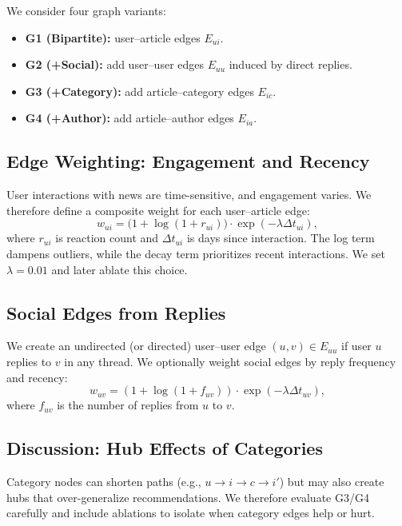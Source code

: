 \documentclass[11pt]{article}
\begin{document}
We consider four graph variants:
\begin{itemize}[leftmargin=*]
  \item \textbf{G1 (Bipartite):} user--article edges \(E_{ui}\).
  \item \textbf{G2 (+Social):} add user--user edges \(E_{uu}\) induced by direct replies.
  \item \textbf{G3 (+Category):} add article--category edges \(E_{ic}\).
  \item \textbf{G4 (+Author):} add article--author edges \(E_{ia}\).
\end{itemize}

\subsection{Edge Weighting: Engagement and Recency}
User interactions with news are time-sensitive, and engagement varies. We therefore define a composite weight for each user--article edge:
\begin{equation}
w_{ui} = \big(1+\log(1+r_{ui})\big)\cdot \exp(-\lambda \Delta t_{ui}),
\label{eq:wui}
\end{equation}
where \(r_{ui}\) is reaction count and \(\Delta t_{ui}\) is days since interaction. The log term dampens outliers, while the decay term prioritizes recent interactions. We set \(\lambda=0.01\) and later ablate this choice.

\subsection{Social Edges from Replies}
We create an undirected (or directed) user--user edge \((u,v)\in E_{uu}\) if user \(u\) replies to \(v\) in any thread. We optionally weight social edges by reply frequency and recency:
\begin{equation}
w_{uv} = (1+\log(1+f_{uv}))\cdot \exp(-\lambda \Delta t_{uv}),\end{equation}
where \(f_{uv}\) is the number of replies from \(u\) to \(v\).

\subsection{Discussion: Hub Effects of Categories}
Category nodes can shorten paths (e.g., \(u\to i\to c\to i'\)) but may also create hubs that over-generalize recommendations. We therefore evaluate G3/G4 carefully and include ablations to isolate when category edges help or hurt.
\end{document}
